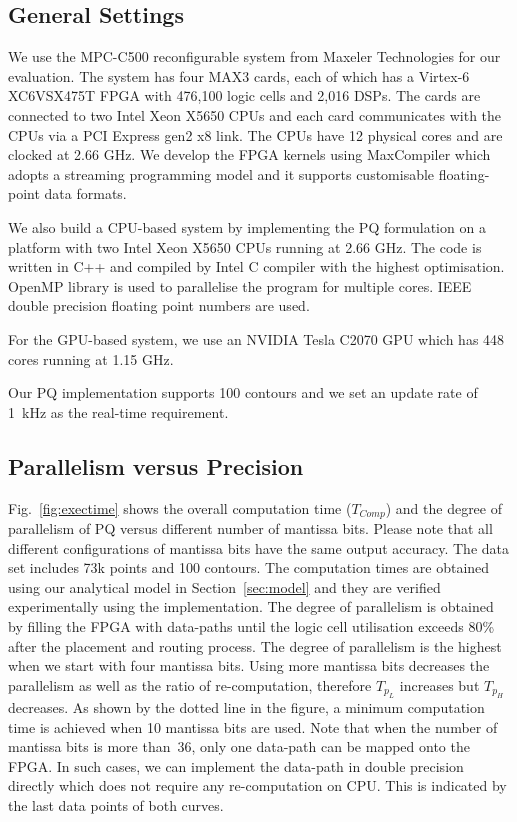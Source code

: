 \subsection{General Settings}
We use the MPC-C500 reconfigurable system from Maxeler Technologies for our evaluation.
The system has four MAX3 cards, each of which has a Virtex-6 XC6VSX475T FPGA with 476,100 logic cells and 2,016 DSPs.
The cards are connected to two Intel Xeon X5650 CPUs and each card communicates with the CPUs via a PCI Express gen2 x8 link. 
The CPUs have 12 physical cores and are clocked at 2.66 GHz.
We develop the FPGA kernels using MaxCompiler which adopts a streaming programming model and it supports customisable floating-point data formats.

We also build a CPU-based system by implementing the PQ formulation on a platform with two Intel Xeon X5650 CPUs running at 2.66 GHz.
The code is written in C++ and compiled by Intel C compiler with the highest optimisation.
OpenMP library is used to parallelise the program for multiple cores.
IEEE double precision floating point numbers are used.

For the GPU-based system, we use an NVIDIA Tesla C2070 GPU which has 448 cores running at 1.15 GHz.

Our PQ implementation supports 100 contours and we set an update rate of 1~kHz as the real-time requirement.

\subsection{Parallelism versus Precision}
\label{sec:parallelism}

Fig.~\ref{fig:exectime} shows the overall computation time ($T_{Comp}$)
and the degree of parallelism of PQ versus different number of mantissa bits.
Please note that all different configurations of mantissa bits have the same output accuracy.
The data set includes 73k points and 100 contours.
The computation times are obtained using our analytical model in Section~\ref{sec:model} and they are verified experimentally using the implementation.
The degree of parallelism is obtained by filling the FPGA with data-paths until the logic cell utilisation exceeds 80\% after the placement and routing process.
The degree of parallelism is the highest when we start with four mantissa bits.
Using more mantissa bits decreases the parallelism as well as the ratio of re-computation, therefore $T_{p_L}$ increases but $T_{p_H}$ decreases.
As shown by the dotted line in the figure, a minimum computation time is achieved when 10 mantissa bits are used.
Note that when the number of mantissa bits is more than~36, only one data-path can be mapped onto the FPGA.
In such cases, we can implement the data-path in double precision directly which does not require any re-computation on CPU.
This is indicated by the last data points of both curves.

